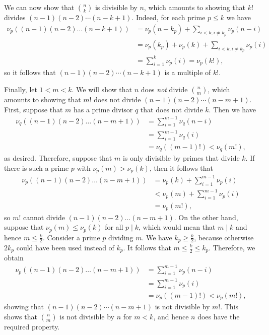 We can now show that $\binom{n}{k}$ is divisible by $n$,  which amounts to
showing that $k!$ divides $(n-1)(n-2) \dotsm (n-k+1)$.  Indeed,  for each prime $p \le k$ we have
\begin{align*}
\nu_p\left( (n-1)(n-2) \dots (n-k+1) \right) &=  \nu_p(n-k_p) + \sum_{i<k,  i \neq k_p} \nu_p(n-i) \\
&= \nu_p(k_p) + \nu_p(k) + \sum_{i<k, i \neq k_p} \nu_p(i) \\
&= \sum_{i=1}^k \nu_p(i) = \nu_p(k!),
\end{align*}
so it follows that $(n-1)(n-2) \dotsm (n-k+1)$ is a multiple of $k!$.

Finally,  let $1<m<k$.  We will show that $n$ does \emph{not} divide
$\binom{n}{m}$,  which amounts to showing that $m!$ does not divide $(n-1)(n-2)
\dotsm (n-m+1)$.  First,  suppose that $m$ has a prime divisor $q$ that does not divide $k$.  Then we have
\begin{align*}
  \nu_q\left( (n-1)(n-2) \dots (n-m+1) \right) &= \sum_{i=1}^{m-1} \nu_q(n-i) \\
  &= \sum_{i=1}^{m-1} \nu_q(i) \\
  &= \nu_q((m-1)!) < \nu_q(m!),
\end{align*}
as desired. Therefore,  suppose that $m$ is only divisible by primes that divide $k$.  If there is such a prime $p$ with $\nu_p(m) > \nu_p(k)$,  then it follows that
\begin{align*}
  \nu_p\left( (n-1)(n-2) \dots (n-m+1) \right)
  &= \nu_p(k) + \sum_{i=1}^{m-1} \nu_p(i) \\
  &< \nu_p(m) + \sum_{i=1}^{m-1}
  \nu_p(i) \\
  &= \nu_p(m!),
\end{align*}
so $m!$ cannot divide $(n-1)(n-2) \dots (n-m+1)$.  On the other hand,  suppose
that $\nu_p(m) \le \nu_p(k)$ for all $p \mid k$, which would mean that $m \mid
k$ and hence $m \le \frac{k}{2}$.  Consider a prime $p$ dividing $m$.  We have
$k_p \ge \frac{k}{2}$,  because otherwise $2k_p$ could have been used instead of
$k_p$. It follows that $m \le \frac{k}{2} \le k_p$. Therefore, we obtain
\begin{align*}
  \nu_p\left( (n-1)(n-2) \dots (n-m+1) \right) &= \sum_{i=1}^{m-1} \nu_p(n-i) \\
  &= \sum_{i=1}^{m-1} \nu_p(i)  \\
  &= \nu_p((m-1)!) < \nu_p(m!),
\end{align*}
showing that $(n-1)(n-2) \dotsm (n-m+1)$ is not divisible by $m!$.
This shows that $\binom{n}{m}$ is not divisible by $n$ for $m<k$,
and hence $n$ does have the required property.
